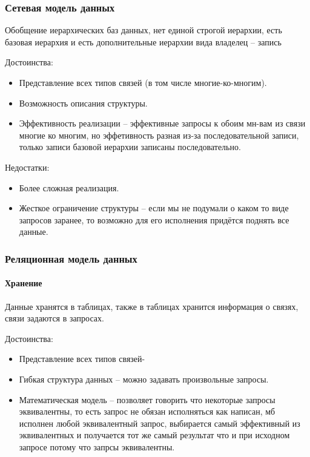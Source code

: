 \subsubsection{Сетевая модель данных}

Обобщение иерархических баз данных, нет единой строгой иерархии, есть базовая иерархия и есть
дополнительные иерархии вида владелец -- запись

\enewline

Достоинства:
\begin{itemize}
	\item Представление всех типов связей (в том числе многие-ко-многим).
	\item Возможность описания структуры.
	\item Эффективность реализации -- эффективные запросы к обоим мн-вам из связи многие ко многим, но
	      эффетивность разная из-за последовательной записи, только записи базовой иерархии записаны
	      последовательно.
\end{itemize}

Недостатки:
\begin{itemize}
	\item Более сложная реализация.
	\item Жесткое ограничение структуры -- если мы не подумали о каком то виде запросов заранее, то возможно
	      для его исполнения придётся поднять все данные.
\end{itemize}

\subsubsection{Реляционная модель данных}
\paragraph{Хранение}

Данные хранятся в таблицах, также в таблицах хранится информация о связях, связи задаются в
запросах.

\enewline

Достоинства:
\begin{itemize}
	\item Представление всех типов связей-
	\item Гибкая структура данных -- можно задавать произвольные запросы.
	\item Математическая модель -- позволяет говорить что некоторые запросы эквивалентны, то есть запрос не
	      обязан исполняться как написан, мб исполнен любой эквивалентный запрос, выбирается самый
	      эффективный из эквивалентных и получается тот же самый результат что и при исходном запросе потому
	      что запрсы эквивалентны.
\end{itemize}

